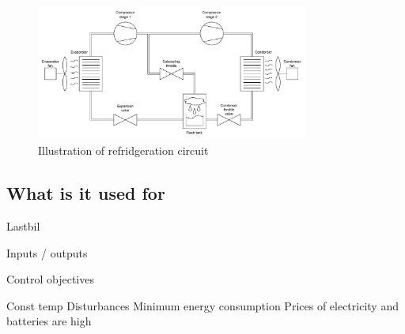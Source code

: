\begin{figure}[h!]
	\centering
	\includegraphics[width=0.8\textwidth]{Graphics/HVAC_Diagram_Fans.pdf}
	\caption{Illustration of refridgeration circuit}
	\label{fig:HVAC_Diagram}
\end{figure}





\subsection{What is it used for}
	Lastbil
	
	
Inputs / outputs

Control objectives

	Const temp
		Disturbances
	Minimum energy consumption
		Prices of electricity and batteries are high
		

